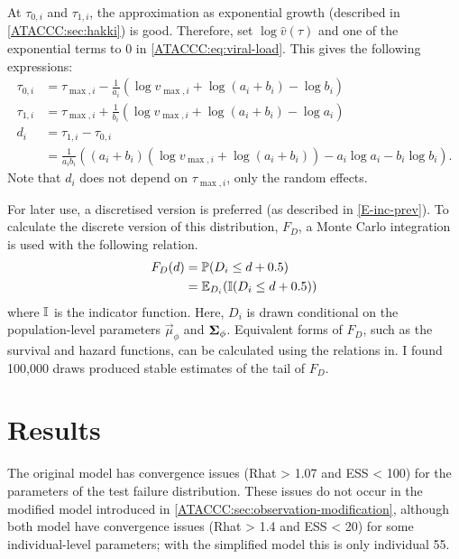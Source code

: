 \documentclass[thesis.tex]{subfiles}
\begin{document}
At $\tau_{0,i}$ and $\tau_{1,i}$, the approximation as exponential growth (described in \cref{ATACCC:sec:hakki}) is good.
Therefore, set $\log \hat{v}(\tau)$ and one of the exponential terms to 0 in \cref{ATACCC:eq:viral-load}.
This gives the following expressions:
$$
\begin{aligned}
\tau_{0,i}
&= \tau_{\max,i} - \frac{1}{a_i} \left(\log v_{\max,i} + \log(a_i + b_i) - \log b_i \right) \\
\tau_{1,i}
&= \tau_{\max,i} + \frac{1}{b_i} \left(\log v_{\max,i} + \log(a_i + b_i) - \log a_i \right) \\
d_i
&= \tau_{1,i} - \tau_{0,i}  \\
&= \frac{1}{a_i b_i} \left( (a_i + b_i) (\log v_{\max,i} + \log(a_i + b_i)) - a_i \log a_i - b_i \log b_i \right).
\end{aligned}
$$
Note that $d_i$ does not depend on $\tau_{\max,i}$, only the random effects.

For later use, a discretised version is preferred (as described in \cref{E-inc-prev}).
To calculate the discrete version of this distribution, $F_D$, a Monte Carlo integration is used with the following relation.
\begin{align}
  F_D(d)
  &= \operatorname{\mathbb{P}}(D_i \leq d + 0.5) \\
  &= \operatorname{\mathbb{E}}_{D_i}(\operatorname{\mathbb{I}}(D_i \leq d + 0.5)) 
\end{align}
where $\operatorname{\mathbb{I}}$ is the indicator function.
Here, $D_i$ is drawn conditional on the population-level parameters $\vec{\mu}_\phi$ and $\bm{\Sigma}_\phi$.
Equivalent forms of $F_D$, such as the survival and hazard functions, can be calculated using the relations in.
I found 100,000 draws produced stable estimates of the tail of $F_D$.

\section{Results} \label{ATACCC:sec:results-discussion}

The original \textcite{hakkiOnset} model has convergence issues (Rhat > 1.07 and ESS < 100) for the parameters of the test failure distribution.
These issues do not occur in the modified model introduced in \cref{ATACCC:sec:observation-modification}, although both model have convergence issues (Rhat > 1.4 and ESS < 20) for some individual-level parameters; with the simplified model this is only individual 55.
\end{document}
